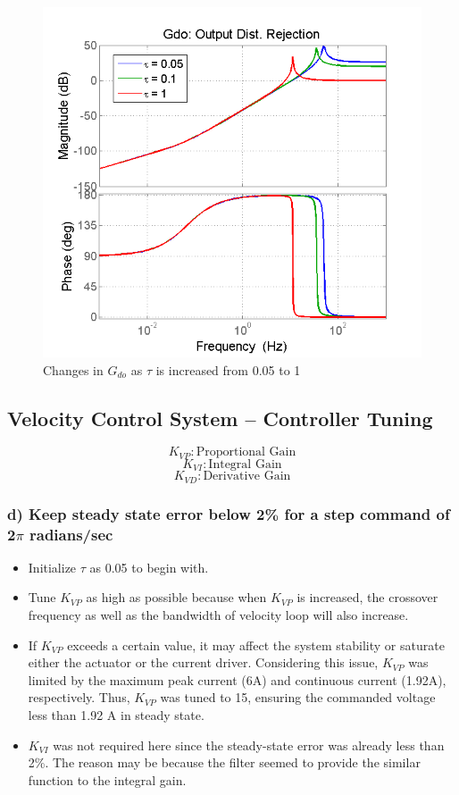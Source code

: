 \documentclass{article}
\theoremstyle{plain}
\theoremstyle{definition}
\theoremstyle{remark}
\begin{document}
\begin{figure}[htb]
\begin{center}
\includegraphics[width = 10 cm]{q3_10}
\caption{Changes in $G_{do}$  as $\tau$ is increased from 0.05 to 1}
\label{q3_10}
\end{center}
\end{figure}

\clearpage

\subsection*{Velocity Control System – Controller Tuning}
$$K_{VP} : \text{Proportional Gain}$$
$$K_{VI} : \text{Integral Gain}$$
$$K_{VD} : \text{Derivative Gain}$$

\subsubsection*{d) Keep steady state error below 2\% for a step command of 2$\pi$ radians/sec}
\begin{itemize}
\item Initialize $\tau$ as 0.05 to begin with.
\item Tune $K_{VP}$ as high as possible because when $K_{VP}$ is increased, the crossover frequency as well as the bandwidth of velocity loop will also increase.
\item If $K_{VP}$ exceeds a certain value, it may affect the system stability or saturate either the actuator or the current driver. Considering this issue, $K_{VP}$ was limited by the maximum peak current (6A) and continuous current (1.92A), respectively. Thus, $K_{VP}$  was tuned to 15, ensuring the commanded voltage less than 1.92 A in steady state.  
\item $K_{VI}$ was not required here since the steady-state error was already less than 2\%. The reason may be because the filter seemed to provide the similar function to the integral gain.
\end{itemize}
\end{document}
